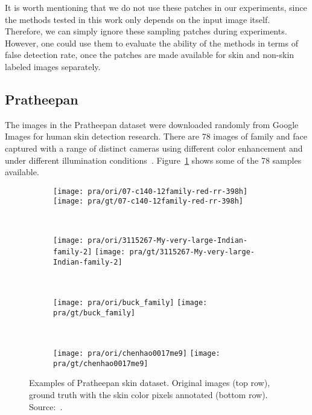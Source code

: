 It is worth mentioning that we do not use these patches in our experiments, since the methods tested in this work only depends on the input image itself. Therefore, we can simply ignore these sampling patches during experiments. However, one could use them to evaluate the ability of the methods in terms of false detection rate, once the patches are made available for skin and non-skin labeled images separately.


\subsection{Pratheepan}
\label{sec:datasets_pratheepan}
The images in the Pratheepan dataset were downloaded randomly from Google Images for human skin detection research. There are 78 images of family and face captured with a range of distinct cameras using different color enhancement and under different illumination conditions~\cite{tan:12}. Figure~\ref{fig:pra_dataset_exemplo} shows some of the 78 samples available.

\begin{figure}[!htb]
    \centering
    \begin{subfigure}[t]{0.238\textwidth}
        \texttt{[image: pra/ori/07-c140-12family-red-rr-398h]}
        \texttt{[image: pra/gt/07-c140-12family-red-rr-398h]}
    \end{subfigure}
    ~
    \begin{subfigure}[t]{0.25\textwidth}
        \texttt{[image: pra/ori/3115267-My-very-large-Indian-family-2]}
        \texttt{[image: pra/gt/3115267-My-very-large-Indian-family-2]}
    \end{subfigure}
    ~
    \begin{subfigure}[t]{0.25\textwidth}
        \texttt{[image: pra/ori/buck\_family]}
        \texttt{[image: pra/gt/buck\_family]}
    \end{subfigure}
    ~
    \begin{subfigure}[t]{0.141\textwidth}
        \texttt{[image: pra/ori/chenhao0017me9]}
        \texttt{[image: pra/gt/chenhao0017me9]}
    \end{subfigure}
    \caption[Examples of Pratheepan skin dataset]{Examples of Pratheepan skin dataset. Original images (top row), ground truth with the skin color pixels annotated (bottom row). Source:~\citet{tan:12}.}
    \label{fig:pra_dataset_exemplo}
\end{figure}


